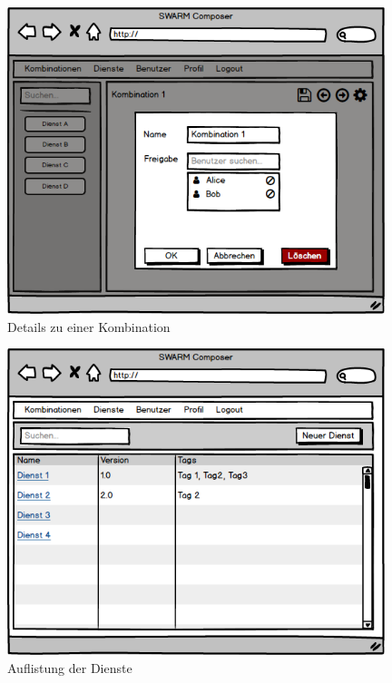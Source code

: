 \begin{figure}[ht]
	\centering
	\includegraphics[keepaspectratio,width=11cm]{img/webfrontend/Kombinationen_Optionen.png}
	\caption{Details zu einer Kombination}
\end{figure}

\begin{figure}[ht]
	\centering
	\includegraphics[keepaspectratio,width=11cm]{img/webfrontend/Dienste.png}
	\caption{Auflistung der Dienste}
\end{figure}

